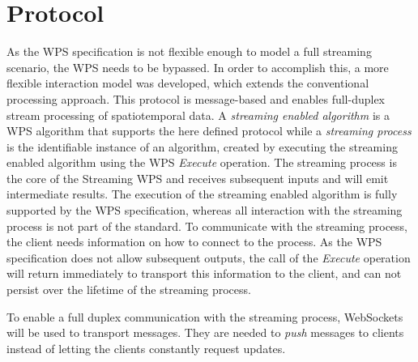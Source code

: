 \section{Protocol}
  As the \ac{WPS} specification is not flexible enough to model a full streaming scenario, the \ac{WPS} needs to be bypassed. In order to accomplish this, a more flexible interaction model was developed, which extends the conventional processing approach. This protocol is message-based and enables full-duplex stream processing of spatiotemporal data. A \emph{streaming enabled algorithm} is a \ac{WPS} algorithm that supports the here defined protocol while a \emph{streaming process} is the identifiable instance of an algorithm, created by executing the streaming enabled algorithm using the \ac{WPS} \emph{Execute} operation. The streaming process is the core of the Streaming \ac{WPS} and receives subsequent inputs and will emit intermediate results. The execution of the streaming enabled algorithm is fully supported by the \ac{WPS} specification, whereas all interaction with the streaming process is not part of the standard. To communicate with the streaming process, the client needs information on how to connect to the process. As the \ac{WPS} specification does not allow subsequent outputs, the call of the \emph{Execute} operation will return immediately to transport this information to the client, and can not persist over the lifetime of the streaming process.

  To enable a full duplex communication with the streaming process, WebSockets will be used to transport messages. They are needed to \emph{push} messages to clients instead of letting the clients constantly request updates.

